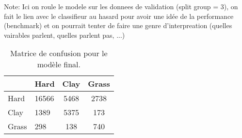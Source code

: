 Note: Ici on roule le modele sur les donnees de validation (split group = 3), on fait le lien avec le classifieur au hasard pour avoir une idée de la performance (benchmark) et on pourrait tenter de faire une genre d'interpreation (quelles vairables parlent, quelles parlent pas, ...)

\begin{table}[H]
	
	\caption{\label{tab:matrice_confusion}Matrice de confusion pour le modèle final.}
	\centering
	\begin{tabular}[t]{llcc}
		\hiderowcolors
		\toprule
		& Hard & Clay & Grass\\
		\midrule
		\showrowcolors
		Hard & 16566 & 5468 & 2738\\
		Clay & 1389 & 5375 & 173\\
		Grass & 298 & 138 & 740\\
		\bottomrule
	\end{tabular}
\end{table}

